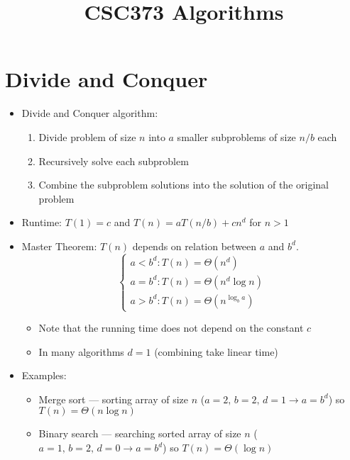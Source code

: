 \documentclass[a4paper,12pt]{article}
\title{\vspace{-50pt}\bfseries{\Large{CSC373 Algorithms}}\vspace{-30pt}}
\author{\normalfont{Jonah Chen}}
\date{}
\begin{document}
\maketitle
\tableofcontents
\sffamily
\section{Divide and Conquer}
\begin{itemize}
    \item Divide and Conquer algorithm:
    \begin{enumerate}
        \item Divide problem of size $n$ into $a$ smaller subproblems of size $n/b$ each
        \item Recursively solve each subproblem
        \item Combine the subproblem solutions into the solution of the original problem
    \end{enumerate}
    \item Runtime: $T(1)=c$ and $T(n)=a T(n/b) + cn^d$ for $n>1$
    \item Master Theorem: $T(n)$ depends on relation between $a$ and $b^d$. \begin{equation}
        \begin{cases}
            a<b^d: T(n)=\Theta(n^d)\\
            a=b^d: T(n)=\Theta(n^d\log n)\\
            a>b^d: T(n)=\Theta(n^{\log_b a})
        \end{cases}
    \end{equation}
    \begin{itemize}
        \item Note that the running time does not depend on the constant $c$
        \item In many algorithms $d=1$ (combining take linear time)
    \end{itemize}
    \item Examples:
    \begin{itemize}
        \item Merge sort --- sorting array of size $n$ ($a=2,\,b=2,\,d=1\rightarrow a=b^d$) so $T(n)=\Theta(n\log n)$
        \item Binary search --- searching sorted array of size $n$ ($a=1,\,b=2,\,d=0\rightarrow a=b^d$) so $T(n)=\Theta(\log n)$
    \end{itemize}
\end{itemize}
\end{document}
